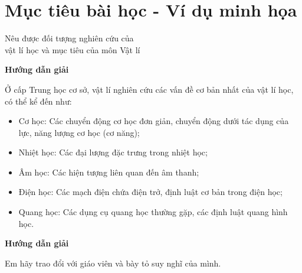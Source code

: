 \section{Mục tiêu bài học - Ví dụ minh họa}
\begin{dang}{Nêu được đối tượng nghiên cứu của\\ vật lí học và mục tiêu của môn Vật lí}
	{	\begin{center}
			\textbf{Hướng dẫn giải}
		\end{center}
		
	Ở cấp Trung học cơ sở, vật lí nghiên cứu các vấn đề cơ bản nhất của vật lí học, có thể kể đến như:
	\begin{itemize}
		\item Cơ học: Các chuyển động cơ học đơn giản, chuyển động dưới tác dụng của lực, năng lượng cơ học (cơ năng);
		\item Nhiệt học: Các đại lượng đặc trưng trong nhiệt học;
		\item Âm học: Các hiện tượng liên quan đến âm thanh;
		\item Điện học: Các mạch điện chứa điện trở, định luật cơ bản trong điện học;
		\item Quang học: Các dụng cụ quang học thường gặp, các định luật quang hình học.
	\end{itemize}
	}
	{	\begin{center}
			\textbf{Hướng dẫn giải}
		\end{center}
	
		Em hãy trao đổi với giáo viên và bày tỏ suy nghĩ của mình.
	}
\end{dang}

